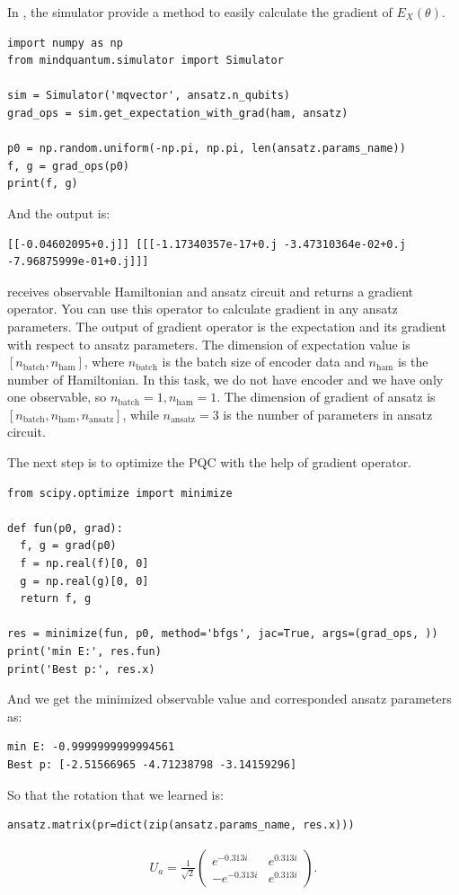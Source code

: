 In \MindQuantum, the simulator provide a method \getexpectationwithgrad to easily calculate the gradient of $E_X(\theta)$.

\begin{lstlisting}
import numpy as np
from mindquantum.simulator import Simulator

sim = Simulator('mqvector', ansatz.n_qubits)
grad_ops = sim.get_expectation_with_grad(ham, ansatz)

p0 = np.random.uniform(-np.pi, np.pi, len(ansatz.params_name))
f, g = grad_ops(p0)
print(f, g)
\end{lstlisting}
And the output is:
\begin{lstlisting}
[[-0.04602095+0.j]] [[[-1.17340357e-17+0.j -3.47310364e-02+0.j -7.96875999e-01+0.j]]]
\end{lstlisting}

\getexpectationwithgrad receives observable Hamiltonian and ansatz circuit and returns a gradient operator. You can use this operator to calculate gradient in any ansatz parameters. The output of gradient operator is the expectation and its gradient with respect to ansatz parameters. The dimension of expectation value is $[n_\text{batch}, n_\text{ham}]$, where $n_\text{batch}$ is the batch size of encoder data and $n_\text{ham}$ is the number of Hamiltonian. In this task, we do not have encoder and we have only one observable, so $n_\text{batch}=1, n_\text{ham}=1$. The dimension of gradient of ansatz is $[n_\text{batch}, n_\text{ham}, n_\text{ansatz}]$, while $n_\text{ansatz} = 3$ is the number of parameters in ansatz circuit.

The next step is to optimize the PQC with the help of gradient operator.
\begin{lstlisting}
from scipy.optimize import minimize

def fun(p0, grad):
  f, g = grad(p0)
  f = np.real(f)[0, 0]
  g = np.real(g)[0, 0]
  return f, g

res = minimize(fun, p0, method='bfgs', jac=True, args=(grad_ops, ))
print('min E:', res.fun)
print('Best p:', res.x)
\end{lstlisting}
And we get the minimized observable value and corresponded ansatz parameters as:
\begin{lstlisting}
min E: -0.9999999999994561
Best p: [-2.51566965 -4.71238798 -3.14159296]
\end{lstlisting}
So that the rotation that we learned is:
\begin{lstlisting}
ansatz.matrix(pr=dict(zip(ansatz.params_name, res.x)))
\end{lstlisting}
\begin{align*}
  U_a=\frac{1}{\sqrt{2}}\begin{pmatrix}
    e^{-0.313i}  & e^{0.313i} \\
    -e^{-0.313i} & e^{0.313i}
  \end{pmatrix}.
\end{align*}


